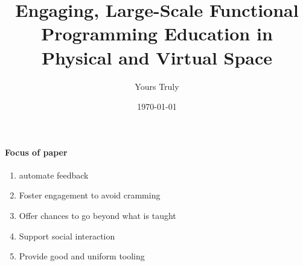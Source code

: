 \documentclass{article}
\title{\textbf{Engaging, Large-Scale Functional Programming Education in Physical and Virtual Space}}
\author{Yours Truly}
\date{\today}
\begin{document}
\maketitle
\abstract{}

\tableofcontents

\paragraph{Focus of paper}
\begin{enumerate}
\item automate feedback
\item Foster engagement to avoid cramming
\item Offer chances to go beyond what is taught
\item Support social interaction
\item Provide good and uniform tooling
\end{enumerate}

\newpage
{}









\newpage


\end{document}
